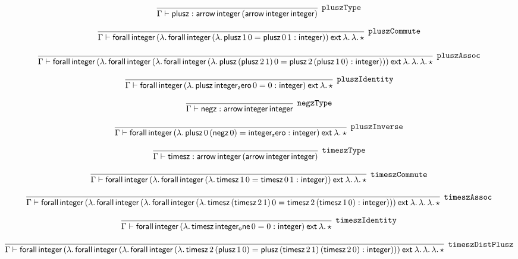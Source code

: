 \[
\infer[{\tt pluszType}]{\Gamma \vdash {\sf plusz}: {\sf arrow}\,{\sf integer}\,({\sf arrow}\,{\sf integer}\,{\sf integer})}{}
\]

\[
\infer[{\tt pluszCommute}]{\Gamma \vdash {\sf forall}\,{\sf integer}\,(\lambda .\,{\sf forall}\,{\sf integer}\,(\lambda .\,{\sf plusz}\,1\,0= {\sf plusz}\,0\,1: {\sf integer}))\:{\sf ext}\:\lambda .\,\lambda .\,\star }{}
\]

\[
\infer[{\tt pluszAssoc}]{\Gamma \vdash {\sf forall}\,{\sf integer}\,(\lambda .\,{\sf forall}\,{\sf integer}\,(\lambda .\,{\sf forall}\,{\sf integer}\,(\lambda .\,{\sf plusz}\,({\sf plusz}\,2\,1)\,0= {\sf plusz}\,2\,({\sf plusz}\,1\,0): {\sf integer})))\:{\sf ext}\:\lambda .\,\lambda .\,\lambda .\,\star }{}
\]

\[
\infer[{\tt pluszIdentity}]{\Gamma \vdash {\sf forall}\,{\sf integer}\,(\lambda .\,{\sf plusz}\,{\sf integer_zero}\,0= 0: {\sf integer})\:{\sf ext}\:\lambda .\,\star }{}
\]

\[
\infer[{\tt negzType}]{\Gamma \vdash {\sf negz}: {\sf arrow}\,{\sf integer}\,{\sf integer}}{}
\]

\[
\infer[{\tt pluszInverse}]{\Gamma \vdash {\sf forall}\,{\sf integer}\,(\lambda .\,{\sf plusz}\,0\,({\sf negz}\,0)= {\sf integer_zero}: {\sf integer})\:{\sf ext}\:\lambda .\,\star }{}
\]

\[
\infer[{\tt timeszType}]{\Gamma \vdash {\sf timesz}: {\sf arrow}\,{\sf integer}\,({\sf arrow}\,{\sf integer}\,{\sf integer})}{}
\]

\[
\infer[{\tt timeszCommute}]{\Gamma \vdash {\sf forall}\,{\sf integer}\,(\lambda .\,{\sf forall}\,{\sf integer}\,(\lambda .\,{\sf timesz}\,1\,0= {\sf timesz}\,0\,1: {\sf integer}))\:{\sf ext}\:\lambda .\,\lambda .\,\star }{}
\]

\[
\infer[{\tt timeszAssoc}]{\Gamma \vdash {\sf forall}\,{\sf integer}\,(\lambda .\,{\sf forall}\,{\sf integer}\,(\lambda .\,{\sf forall}\,{\sf integer}\,(\lambda .\,{\sf timesz}\,({\sf timesz}\,2\,1)\,0= {\sf timesz}\,2\,({\sf timesz}\,1\,0): {\sf integer})))\:{\sf ext}\:\lambda .\,\lambda .\,\lambda .\,\star }{}
\]

\[
\infer[{\tt timeszIdentity}]{\Gamma \vdash {\sf forall}\,{\sf integer}\,(\lambda .\,{\sf timesz}\,{\sf integer_one}\,0= 0: {\sf integer})\:{\sf ext}\:\lambda .\,\star }{}
\]

\[
\infer[{\tt timeszDistPlusz}]{\Gamma \vdash {\sf forall}\,{\sf integer}\,(\lambda .\,{\sf forall}\,{\sf integer}\,(\lambda .\,{\sf forall}\,{\sf integer}\,(\lambda .\,{\sf timesz}\,2\,({\sf plusz}\,1\,0)= {\sf plusz}\,({\sf timesz}\,2\,1)\,({\sf timesz}\,2\,0): {\sf integer})))\:{\sf ext}\:\lambda .\,\lambda .\,\lambda .\,\star }{}
\]


